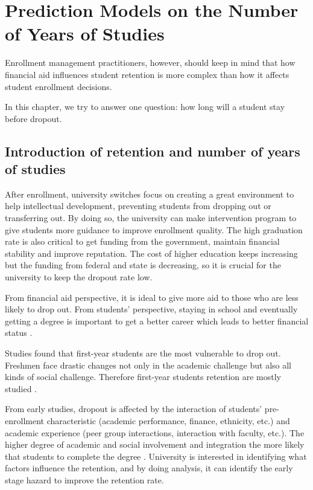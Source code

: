 \documentclass[12pt,english]{report}
\begin{document}
\chapter {Prediction Models on the Number of Years of Studies}
Enrollment management practitioners, however, should keep in mind that how
financial aid influences student retention is more complex than how it affects
student enrollment decisions.

In this chapter, we try to answer one question: how long will a student stay
before dropout. 

\section{Introduction of retention and number of years of studies}
After enrollment, university switches focus on creating a great environment to
help
intellectual development, preventing students from dropping out or transferring
out.
By doing so, the university can make intervention program to give students more
guidance
to improve enrollment quality. The high graduation rate is also critical to get
funding
from the government, maintain financial stability and improve reputation. The
cost of
higher education keeps increasing but the funding from federal and state is
decreasing,
so it is crucial for the university to keep the dropout rate low.

From financial aid perspective, it is ideal to give more aid to those who are
less likely
to drop out. From students' perspective, staying in school and eventually
getting a degree
is important to get a better career which leads to better financial status
\citep{thomas2002}. 


Studies found that first-year students are the most vulnerable to drop out.
Freshmen face 
drastic changes not only in the academic challenge but also all kinds of social
challenge.
Therefore first-year students retention are mostly studied
\citep{Permzadian2016,Kovacic10earlyprediction,Horstmanshof2007,Noble2007}. 


From early studies, dropout is affected by the interaction of students'
pre-enrollment
characteristic (academic performance, finance, ethnicity, etc.)  and academic
experience
(peer group interactions, interaction with faculty, etc.). The higher degree of
academic
and social involvement and integration the more likely that students to
complete the 
degree \citep{Tinto1975, Tinto1982, Terenzini1981}. University is interested in
identifying
what factors influence the retention, and by doing analysis, it can identify
the
early stage hazard to improve the retention rate.
\end{document}
